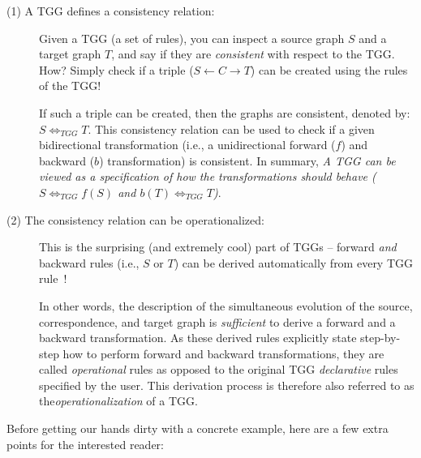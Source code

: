 \begin{description}

\item[(1) A TGG defines a consistency relation:]%
Given a TGG (a set of rul\-es), you can inspect a source graph $S$ and a target graph $T$, and say if they are \emph{consistent} with respect to the TGG. How?
Simply check if a triple ($S\leftarrow C\rightarrow T$) can be created using the rules of the TGG!

\vspace{0.25cm}

If such a triple can be created, then the graphs are consistent, denoted by: $S \Leftrightarrow_{TGG} T$. This consistency relation can be used to check if a
given bidirectional transformation (i.e., a unidirectional forward ($f$) and backward ($b$) transformation) is consistent. In summary, \emph{A TGG can be
viewed as a specification of how the transformations \emph{should} behave ($S \Leftrightarrow_{TGG} f(S)$ and $b(T) \Leftrightarrow_{TGG} T$)}.
	
\item[(2) The consistency relation can be operationalized:]%
This is the surprising (and extremely cool) part of TGGs -- forward \emph{and} backward rules (i.e., $S$ or $T$) can be derived automatically from every TGG
rule~\cite{Giese2010,Hermann2011a}! 

\vspace{0.25cm}

In other words, the description of the simultaneous evolution of the source, correspondence, and target graph is \emph{sufficient} to derive a forward and
a backward transformation. As these derived rules explicitly state step-by-step how to perform forward and backward transformations, they are called
\emph{operational} rules as opposed to the original TGG \emph{declarative} rules specified by the user. This derivation process is therefore also referred to
as the\emph{operationalization} of a TGG.
	
\end{description}

Before getting our hands dirty with a concrete example, here are a few extra points for the interested reader:  


